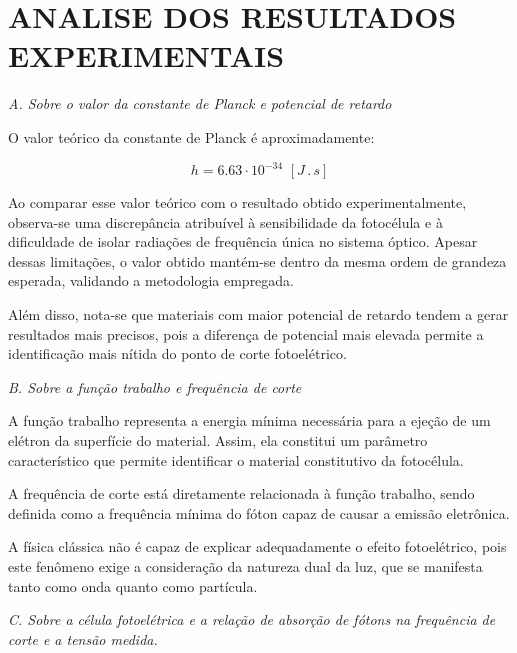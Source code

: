 \documentclass[10pt,twocolumn,letterpaper]{article}
\begin{document}
\section{ANALISE DOS RESULTADOS EXPERIMENTAIS}

\noindent\textit{A. Sobre o valor da constante de Planck e potencial de
retardo}

\noindent O valor teórico da constante de Planck é aproximadamente:

\vspace{-.3cm}

\begin{equation*}
    h = 6.63 \cdot 10^{-34} \,\, [J\,.\,s]
\end{equation*}

\vspace{-.22cm}

\hspace{1cm} Ao comparar esse valor teórico com o resultado obtido experimentalmente, observa-se uma discrepância atribuível à sensibilidade da fotocélula e à dificuldade de isolar radiações de frequência única no sistema óptico. Apesar dessas limitações, o valor obtido mantém-se dentro da mesma ordem de grandeza esperada, validando a metodologia empregada.

\hspace{1cm} Além disso, nota-se que materiais com maior potencial de retardo tendem a gerar resultados mais precisos, pois a diferença de potencial mais elevada permite a identificação mais nítida do ponto de corte fotoelétrico.

\noindent\textit{B. Sobre a função trabalho e frequência de corte}

\hspace{1cm} A função trabalho representa a energia mínima necessária para a ejeção de um elétron da superfície do material. Assim, ela constitui um parâmetro característico que permite identificar o material constitutivo da fotocélula.

\hspace{1cm} A frequência de corte está diretamente relacionada à função trabalho, sendo definida como a frequência mínima do fóton capaz de causar a emissão eletrônica.

\hspace{1cm} A física clássica não é capaz de explicar adequadamente o efeito fotoelétrico, pois este fenômeno exige a consideração da natureza dual da luz, que se manifesta tanto como onda quanto como partícula.

\noindent\textit{C. Sobre a célula fotoelétrica e a relação de absorção de
fótons na frequência de corte e a tensão medida.}
\end{document}
